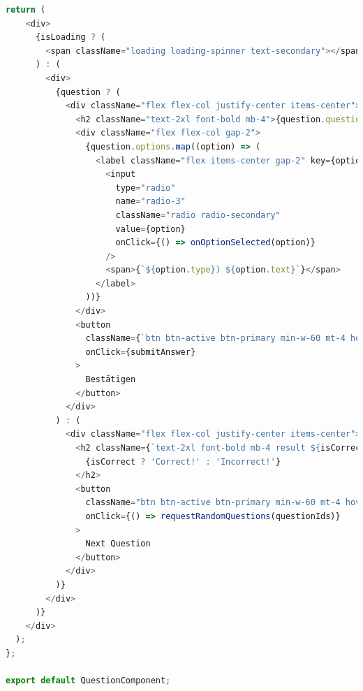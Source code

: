 \documentclass[biblatex]{lni}
\begin{document}
\begin{lstlisting}[caption={QuestionComponent.jsx}, label=qc-rc, language=javascript]
  return (
    <div>
      {isLoading ? (
        <span className="loading loading-spinner text-secondary"></span>
      ) : (
        <div>
          {question ? (
            <div className="flex flex-col justify-center items-center">
              <h2 className="text-2xl font-bold mb-4">{question.question}</h2>
              <div className="flex flex-col gap-2">
                {question.options.map((option) => (
                  <label className="flex items-center gap-2" key={option.type}>
                    <input
                      type="radio"
                      name="radio-3"
                      className="radio radio-secondary"
                      value={option}
                      onClick={() => onOptionSelected(option)}
                    />
                    <span>{`${option.type}) ${option.text}`}</span>
                  </label>
                ))}
              </div>
              <button
                className={`btn btn-active btn-primary min-w-60 mt-4 hover:bg-primary-dark ${!selectedAnswer ? 'btn-disabled' : ''}`}
                onClick={submitAnswer}
              >
                Bestätigen
              </button>
            </div>
          ) : (
            <div className="flex flex-col justify-center items-center">
              <h2 className={`text-2xl font-bold mb-4 result ${isCorrect === false ? 'wrong' : ''}`}>
                {isCorrect ? 'Correct!' : 'Incorrect!'}
              </h2>
              <button
                className="btn btn-active btn-primary min-w-60 mt-4 hover:bg-primary-dark"
                onClick={() => requestRandomQuestions(questionIds)}
              >
                Next Question
              </button>
            </div>
          )}
        </div>
      )}
    </div>
  );
};

export default QuestionComponent;
\end{lstlisting}
\end{document}
